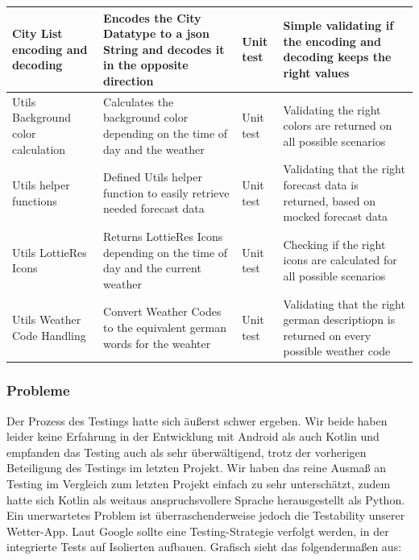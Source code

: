 \documentclass{article}
\begin{document}
\begin{center}
\begin{tabularx}{\textwidth}{| X | X | X | X |}
    \hline
    City List encoding and decoding & Encodes the City Datatype to a json String and decodes it in the opposite direction & Unit test & Simple validating if the encoding and decoding keeps the right values  \\
    \hline
    Utils Background color calculation & Calculates the background color depending on the time of day and the weather & Unit test & Validating the right colors are returned on all possible scenarios  \\
    \hline
    Utils helper functions & Defined Utils helper function to easily retrieve needed forecast data & Unit test & Validating that the right forecast data is returned, based on mocked forecast data  \\
    \hline
    Utils LottieRes Icons & Returns LottieRes Icons depending on the time of day and the current weather & Unit test & Checking if the right icons are calculated for all possible scenarios  \\
    \hline
    Utils Weather Code Handling & Convert Weather Codes to the equivalent german words for the weahter & Unit test & Validating that the right german descriptiopn is returned on every possible weather code  \\
    \hline
  \end{tabularx}
\end{center}

\subsubsection{Probleme}

Der Prozess des Testings hatte sich äußerst schwer ergeben. Wir beide haben leider keine Erfahrung in der Entwicklung mit Android als auch Kotlin und empfanden das Testing auch als sehr überwältigend, trotz der vorherigen Beteiligung des Testings im letzten Projekt. Wir haben das reine Ausmaß an Testing im Vergleich zum letzten Projekt einfach zu sehr unterschätzt, zudem hatte sich Kotlin als weitaus anspruchsvollere Sprache herausgestellt als Python. Ein unerwartetes Problem ist überraschenderweise jedoch die Testability unserer Wetter-App. Laut Google sollte eine Testing-Strategie verfolgt werden, in der integrierte Tests auf Isolierten aufbauen. Grafisch sieht das folgendermaßen aus:
\end{document}
